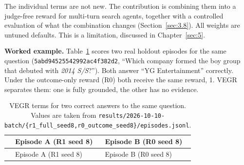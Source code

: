 The individual terms are not new. The contribution is combining them
into a judge-free reward for multi-turn search agents, together with a
controlled evaluation of what the combination changes
(Section~\ref{sec:3.8}). All weights are untuned defaults. This is a
limitation, discussed in Chapter~\ref{sec:5}.

\textbf{Worked example.} Table~\ref{tbl:3.1} scores two real holdout
episodes for the same question
(\texttt{5abd\allowbreak{}9452\allowbreak{}5542\allowbreak{}992a\allowbreak{}c4f3\allowbreak{}82d2\allowbreak{}},
``Which company formed the boy group that debuted with \emph{2014
S/S}?''). Both answer ``YG Entertainment'' correctly. Under the
outcome-only reward (R0) both receive the same reward, 1. VEGR separates
them: one is fully grounded, the other has no evidence.

\begin{longtable}[]{@{}
  >{\raggedright\arraybackslash}p{}
  >{\raggedright\arraybackslash}p{}
  >{\raggedright\arraybackslash}p{}@{}}
\caption{VEGR terms for two correct answers to the same question. Values
are taken from
\texttt{results/\allowbreak{}2026-\allowbreak{}10-\allowbreak{}10-\allowbreak{}batch/\allowbreak{}\{r1\_\allowbreak{}full\_\allowbreak{}seed8,r0\_\allowbreak{}outcome\_\allowbreak{}seed8\}/\allowbreak{}episodes.\allowbreak{}jsonl}.}\label{tbl:3.1}\tabularnewline
\toprule\noalign{}
\begin{minipage}[b]{\linewidth}\raggedright
\end{minipage} & \begin{minipage}[b]{\linewidth}\raggedright
Episode A (R1 seed 8)
\end{minipage} & \begin{minipage}[b]{\linewidth}\raggedright
Episode B (R0 seed 8)
\end{minipage} \\
\midrule\noalign{}
\endfirsthead
\toprule\noalign{}
\begin{minipage}[b]{\linewidth}\raggedright
\end{minipage} & \begin{minipage}[b]{\linewidth}\raggedright
Episode A (R1 seed 8)
\end{minipage} & \begin{minipage}[b]{\linewidth}\raggedright
Episode B (R0 seed 8)
\end{minipage} \\

\end{longtable}
